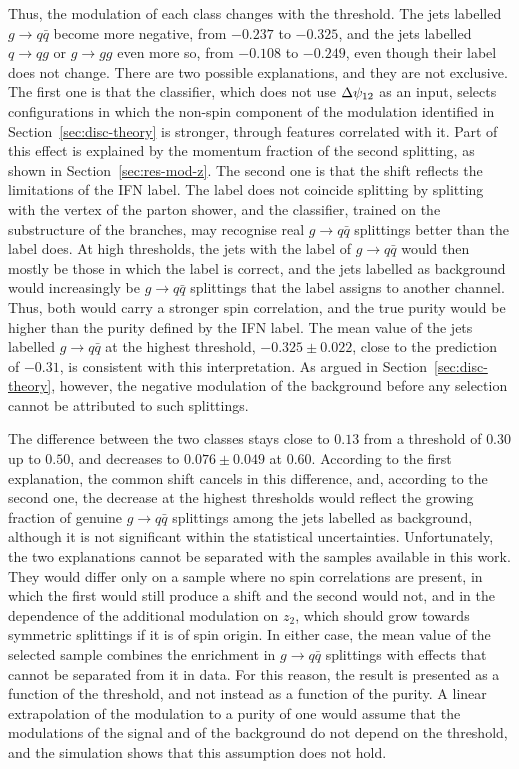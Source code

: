 Thus, the modulation of each class changes with the threshold. The jets labelled
$g \to q\bar{q}$ become more negative, from $-0.237$ to $-0.325$, and the jets
labelled $q \to qg$ or $g \to gg$ even more so, from $-0.108$ to $-0.249$,
even though their label does not change. There are two possible explanations, and
they are not exclusive. The first one is that the classifier, which does not use $\Delta\psi_{12}$ as an
input, selects configurations in which the non-spin component of the modulation 
identified in Section~\ref{sec:disc-theory} is stronger, through features
correlated with it. Part of this effect is explained by the momentum fraction of
the second splitting, as shown in Section~\ref{sec:res-mod-z}. The second one 
is that the shift reflects the limitations of the IFN label. The label does not
coincide splitting by splitting with the vertex of the parton shower, and the classifier,
trained on the substructure of the branches, may recognise real
$g \to q\bar{q}$ splittings better than the label does. At high thresholds, the jets 
with the label of $g \to q\bar{q}$ would then mostly be those in which the label is
correct, and the jets labelled as background would increasingly be
$g \to q\bar{q}$ splittings that the label assigns to another channel. Thus,
both would carry a stronger spin correlation, and the true purity would be
higher than the purity defined by the IFN label. The mean value of the
jets labelled $g \to q\bar{q}$ at the highest threshold, $-0.325 \pm 0.022$, close
to the prediction of $-0.31$, is consistent with this interpretation. As argued in
Section~\ref{sec:disc-theory}, however, the negative modulation of the background
before any selection cannot be attributed to such splittings.

The difference between the two classes stays close to $0.13$ from a threshold of
$0.30$ up to $0.50$, and decreases to $0.076 \pm 0.049$ at $0.60$. According to the
first explanation, the common shift cancels in this difference, and, according to the second one,
the decrease at the highest thresholds would reflect the growing fraction of genuine
$g \to q\bar{q}$ splittings among the jets labelled as background, although it is
not significant within the statistical uncertainties. Unfortunately, the two explanations
cannot be separated with the samples available in this work. They would differ only on
a sample where no spin correlations are present, in which the first would still produce 
a shift and the second would not, and in the dependence of the additional modulation on
$z_2$, which should grow towards symmetric splittings if it is of spin origin. In
either case, the mean value of the selected sample combines the enrichment in
$g \to q\bar{q}$ splittings with effects that cannot be separated from it in data.
For this reason, the result is presented as a function of the threshold, and not instead 
as a function of the purity. A linear extrapolation of the modulation
to a purity of one would assume that the modulations of the signal and of the
background do not depend on the threshold, and the simulation shows that this
assumption does not hold.


